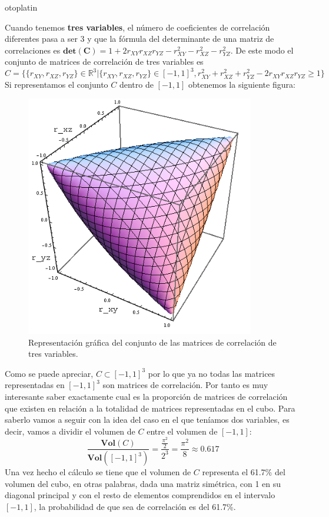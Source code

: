 otoplatin\documentclass[a4paper,openright,12pt]{report}
\begin{document}
{\normalsize Cuando tenemos \textbf{tres variables}, el número de coeficientes de correlación diferentes pasa a ser 3 y que la fórmula del determinante de una matriz de correlaciones es 
$\mathbf{det(C)}=1+2r_{XY}r_{XZ}r_{YZ}-r_{XY}^{2}-r_{XZ}^{2}-r_{YZ}^{2}$. De este modo el conjunto de matrices de correlación de tres variables es} {\tiny $$C=\lbrace\lbrace r_{XY},r_{XZ},r_{YZ}\rbrace \in \mathbb{R}^{3} \vert \lbrace r_{XY},r_{XZ},r_{YZ} \rbrace \in [-1,1]^{3}, r_{XY}^{2}+r_{XZ}^{2}+r_{YZ}^{2}-2r_{XY}r_{XZ}r_{YZ} \geq 1 \rbrace$$}
Si representamos el conjunto $C$ dentro de $[-1,1]$ obtenemos la siguiente figura:
\newpage
\medskip 
\begin{figure}[htb]
\begin{center}
\includegraphics[width=10cm]{matriz_correlacion_3vars}
\caption{Representación gráfica del conjunto de las matrices de correlación de tres variables.}
\label{Fig_matriz_correlacion_2vars}
\end{center}
\end{figure}

Como se puede apreciar, $C\subset [-1,1]^{3}$ por lo que ya no todas las matrices representadas en $[-1,1]^{3}$ son matrices de correlación. Por tanto es muy interesante saber exactamente cual es la proporción de matrices de correlación que existen en relación a la totalidad de matrices representadas en el cubo. Para saberlo vamos a seguir con la idea del caso en el que teníamos dos variables, es decir, vamos a dividir el volumen de $C$ entre el volumen de $[-1,1]$: $$\dfrac{\mathbf{Vol}(C)}{\mathbf{Vol}([-1,1]^{3})}=\dfrac{\frac{\pi^{2}}{2}}{2^{3}}=\dfrac{\pi^{2}}{8}\approx 0.617$$
Una vez hecho el cálculo se tiene que el volumen de $C$ representa el 61.7\% del volumen del cubo, en otras palabras, dada una matriz simétrica, con 1 en su diagonal principal y con el resto de elementos comprendidos en el intervalo $[-1,1]$, la probabilidad de que sea de correlación es del 61.7\%. 
\end{document}
